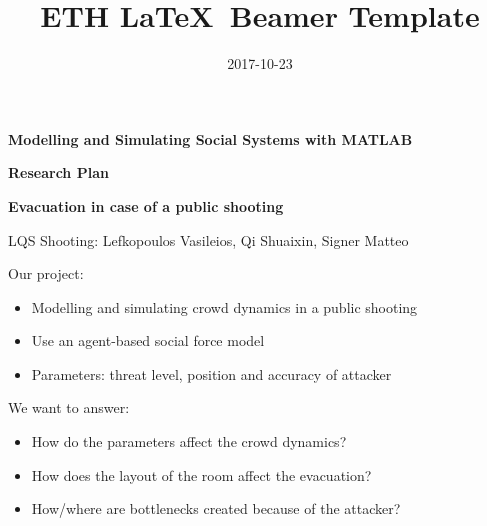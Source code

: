 \documentclass[aspectratio=43]{beamer}
\title{ETH \LaTeX\ Beamer Template}
\date{2017-10-23}
\begin{document}
\begin{frame}

\begin{center}
	{\bfseries Modelling and Simulating Social Systems with MATLAB}
	
	{\bfseries Research Plan}

	{\bfseries Evacuation in case of a public shooting}
	
	{LQS Shooting: Lefkopoulos Vasileios, Qi Shuaixin, Signer Matteo}
\end{center}

Our project:
\begin{itemize}
	\item Modelling and simulating crowd dynamics in a public shooting
	\item Use an agent-based social force model
	\item Parameters: threat level, position and accuracy of attacker
\end{itemize}

We want to answer:
\begin{itemize}
	\item How do the parameters affect the crowd dynamics?
	\item How does the layout of the room affect the evacuation?
	\item How/where are bottlenecks created because of the attacker?
\end{itemize}

\end{frame}
\end{document}
